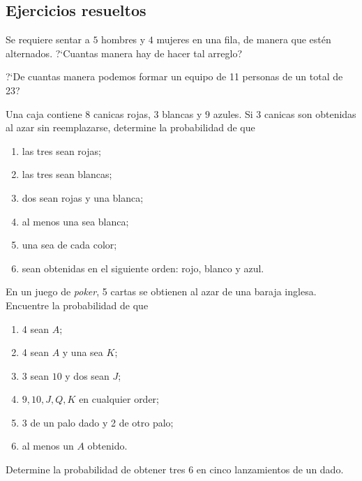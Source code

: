 \subsection{Ejercicios resueltos}
{}
\begin{ejemplo}
	\label{solved:1.22}
	Se requiere sentar a $5$ hombres y $4$ mujeres en una fila, de manera que estén alternados. ?`Cuantas manera hay de hacer tal arreglo?
\end{ejemplo}

{}
\begin{ejemplo}
	\label{solved:1.29}
	?`De cuantas manera podemos formar un equipo de 11 personas de un total de 23?
\end{ejemplo}

{}
\begin{ejemplo}
	\label{solved:1.35}
	Una caja contiene $8$ canicas rojas, $3$ blancas y $9$ azules. Si 3 canicas son obtenidas al azar sin reemplazarse, determine la probabilidad de que
	\begin{enumerate}
		\item las tres sean rojas; 
		\item las tres sean blancas; 
		\item dos sean rojas y una blanca; 
		\item al menos una sea blanca; 
		\item una sea de cada color; 
		\item sean obtenidas en el siguiente orden: rojo, blanco y azul.
	\end{enumerate}
	
\end{ejemplo}

{}
\begin{ejemplo}
	\label{solved:1.36}
	En un juego de \emph{poker}, 5 cartas se obtienen al azar de una baraja inglesa. Encuentre la probabilidad de que
	\begin{enumerate}
		\item 4 sean $A$; 
		\item 4 sean $A$ y una sea $K$; 
		\item 3 sean $10$ y dos sean $J$; 
		\item $9,10,J,Q,K$ en cualquier order; 
		\item 3 de un palo dado y 2 de otro palo; 
		\item al menos un $A$ obtenido.
	\end{enumerate}
	
\end{ejemplo}

{}
\begin{ejemplo}
	\label{solved:1.37}
	Determine la probabilidad de obtener tres $6$ en cinco lanzamientos de un dado.
\end{ejemplo}

%
